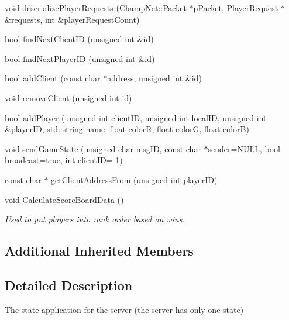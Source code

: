 \begin{DoxyCompactItemize}
void \hyperlink{class_state_server_a1d5bf4d1f14be55beab88feb0a8b5336}{deserialize\-Player\-Requests} (\hyperlink{class_champ_net_1_1_packet}{Champ\-Net\-::\-Packet} $\ast$p\-Packet, Player\-Request $\ast$\&requests, int \&player\-Request\-Count)
\item 
bool \hyperlink{class_state_server_afcde4aa297197e9f2840d24612501b5a}{find\-Next\-Client\-I\-D} (unsigned int \&id)
\item 
bool \hyperlink{class_state_server_a23120a56bdaa4d5e9d555b05e6ba1e8e}{find\-Next\-Player\-I\-D} (unsigned int \&id)
\item 
bool \hyperlink{class_state_server_a4f6675bef8d34e3e3ffbe3e71e16732e}{add\-Client} (const char $\ast$address, unsigned int \&id)
\item 
void \hyperlink{class_state_server_aa1feeeb495d9bf60f5750323e839c02d}{remove\-Client} (unsigned int id)
\item 
bool \hyperlink{class_state_server_a204e3b252a6b6f50015b598e9beb1b09}{add\-Player} (unsigned int client\-I\-D, unsigned int local\-I\-D, unsigned int \&player\-I\-D, std\-::string name, float color\-R, float color\-G, float color\-B)
\item 
void \hyperlink{class_state_server_a7d80660aa2ef7ab52ce8c86752abf145}{send\-Game\-State} (unsigned char msg\-I\-D, const char $\ast$sender=N\-U\-L\-L, bool broadcast=true, int client\-I\-D=-\/1)
\item 
const char $\ast$ \hyperlink{class_state_server_a2220d5a02b2c16cd67499fa38342bcad}{get\-Client\-Address\-From} (unsigned int player\-I\-D)
\item 
\hypertarget{class_state_server_a7a316f25f6f2fd7c66fe95c4cffa5db1}{void \hyperlink{class_state_server_a7a316f25f6f2fd7c66fe95c4cffa5db1}{Calculate\-Score\-Board\-Data} ()}\label{class_state_server_a7a316f25f6f2fd7c66fe95c4cffa5db1}

\begin{DoxyCompactList}\small\item\em Used to put players into rank order based on wins. \end{DoxyCompactList}\end{DoxyCompactItemize}
\subsection*{Additional Inherited Members}


\subsection{Detailed Description}
The state application for the server (the server has only one state) 


